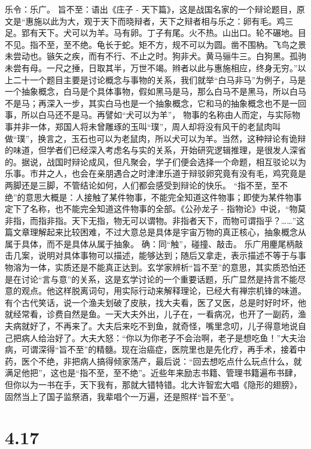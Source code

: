 \documentclass[]{book}
\begin{document}
乐令：乐广。 旨不至：语出《庄子 -
天下篇》，这是战国名家的一个辩论题目，原文是``惠施以此为大，观于天下而晓辩者，天下之辩者相与乐之：卵有毛。鸡三足。郢有天下。犬可以为羊。马有卵。丁子有尾。火不热。山出口。轮不碾地。目不见。指不至，至不绝。龟长于蛇。矩不方，规不可以为圆。凿不围枘。飞鸟之景未尝动也。镞矢之疾，而有不行、不止之时。狗非犬。黄马骊牛三。白狗黑。孤驹未尝有母。一尺之捶，日取其半，万世不竭。辫者以此与惠施相应，终身无穷。''以上二十一个题目主要是讨论概念与事物的关系，我们就举``白马非马''为例子，马是一个抽象概念，白马是个具体事物，假如黑马是马，那么白马不是黑马，所以白马不是马；再深入一步，其实白马也是一个抽象概念，它和马的抽象概念也不是一回事，所以白马还不是马。再譬如``犬可以为羊''，
物事的名称由人而定，与实际物事并非一体，郑国人将未曾雕琢的玉叫``璞''，周人却将没有风干的老鼠肉叫做``璞''，换言之，玉石也可以为老鼠肉，所以犬可以为羊。当然，这种辩论有诡辩的味道，但学者们已经深入考虑名与实的关系，开始研究逻辑推理，是很发人深省的。据说，战国时辩论成风，但凡聚会，学子们便会选择一个命题，相互驳论以为乐事。市井之人，也会在亲朋遇合之时津津乐道于辩驳卵究竟有没有毛，鸡究竟是两脚还是三脚，不管结论如何，人们都会感受到辩论的快乐。
``指不至，至不绝''的意思大概是：人接触了某件物事，不能完全知道这件物事；即使为某件物事定下了名称，也不能完全知道这件物事的全部。《公孙龙子
-
指物论》中说，``物莫非指，而指非指。天下无指，物无可以谓物。非指者天下，而物可谓指乎？\ldots{}\ldots{}''这篇文章理解起来比较困难，不过大意总是具体是宇宙万物的真正核心，抽象概念从属于具体，而不是具体从属于抽象。
确：同``触''，碰撞、敲击。
乐广用麈尾柄敲击几案，说明对具体事物可以描述，能够达到；随后又拿走，表示描述不等于与事物溶为一体，实质还是不能真正达到。玄学家辨析``旨不至''的意思，其实质恐怕还是在讨论``言与意''的关系，这是玄学讨论的一个重要话题，乐广显然是持言不能尽意的观点。他这样脱离词句，用实际行动来解释理论，已经大有禅宗机锋的味道。
有个古代笑话，说一个渔夫划破了皮肤，找大夫看，医了又医，总是时好时坏，他就经常看，诊费自然是鱼。一天大夫外出，儿子在，一看病况，也开了一副药，渔夫病就好了，不再来了。大夫后来吃不到鱼，就奇怪，嘴里念叨，儿子得意地说自己把病人给治好了。大夫大怒：``你以为你老子不会治啊，老子是想吃鱼！''大夫治病，可谓深得``旨不至''的精髓。现在治癌症，医院里也是先化疗，再手术，接着中药，医个不绝，非把病人搞得倾家荡产，最后说：``回去想吃点什么玩点什么，就满足他把''，这也是``指不至，至不绝''。近些年来励志书籍、管理书籍遍布书肆，但你以为一书在手，天下我有，那就大错特错。北大许智宏大唱《隐形的翅膀》，固然当上了国子监祭酒，我辈唱个一万遍，还是照样``旨不至''。

\section{4.17}\label{section-196}
\end{document}
